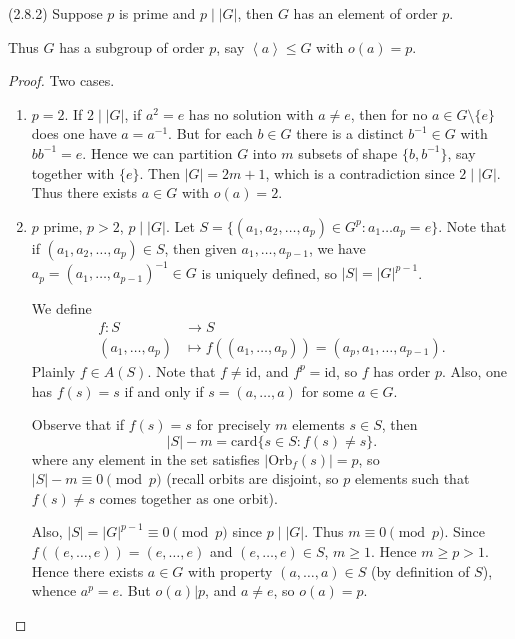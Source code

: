 \begin{theorem}
	(2.8.2)
	Suppose $p$ is prime and $p \mid |G|$, then $G$ has an element of order $p$.

	Thus $G$ has a subgroup of order $p$, say $\left\langle a \right\rangle \le G$ with $o(a) = p$.
\end{theorem}
\begin{proof}
	Two cases.
	\begin{enumerate}
		\item $p = 2$. If $2 \mid |G|$, if $a^2 = e$ has no solution with $a \neq e$, then for no $a \in G \setminus \{e\} $ does one have $a = a^{-1} $. But for each $b \in G$ there is a distinct $b^{-1} \in G$ with $b b^{-1}  = e$. Hence we can partition $G$ into $m$ subsets of shape $\{b, b^{-1} \} $, say together with $\{e\} $. Then $|G| = 2 m + 1$, which is a contradiction since $2 \mid |G|$. Thus there exists  $a \in G$ with $o(a) = 2$.
		\item $p$ prime, $p > 2$, $p \mid |G|$. 
		Let $S = \{\left( a_1, a_2, \ldots, a_p \right) \in G^p: a_1\ldots a_p = e\} $.
		Note that if $(a_1, a_2, \ldots, a_p) \in S$, then given $a_1, \ldots, a_{p-1}$, we have $a_p = (a_1, \ldots, a_{p-1})^{-1}\in G$ is uniquely defined, so $|S| = |G|^{p-1}$.

		We define  
		\begin{align*}
			f: S &\longrightarrow S \\
			\left( a_1, \ldots, a_p \right)  &\longmapsto f(\left( a_1, \ldots, a_p \right) ) = \left( a_p, a_1, \ldots, a_{p-1} \right) 
		.\end{align*}
		Plainly $f \in A(S)$. Note that $f \neq  \text{id}$, and $f^p = \text{id}$, so $f$ has order $p$. Also, one has $f(s) = s$ if and only if  $s=\left( a, \ldots, a \right) $ for some $a \in G$.

		Observe that if $f(s) = s$ for precisely $m$ elements $s \in S$, then \[
			|S| - m
			= \text{card}\{s \in S: f(s)\neq s\} 
		.\] 
		where any element in the set satisfies $|\text{Orb}_f(s) |=p$, so $|S| - m \equiv 0 \pmod p$ (recall orbits are disjoint, so $p$ elements such that $f(s) \neq s$ comes together as one orbit).

		Also, $|S| = |G|^{p-1} \equiv 0 \pmod p$ since $p \mid |G|$. Thus  $m \equiv 0 \pmod p$.
		Since $f\left( (e, \ldots, e) \right) = (e, \ldots, e)$ and $(e ,\ldots,e) \in S$, $m\ge 1$. Hence $m \ge p >1$. Hence there exists $a \in G$ with property $(a, \ldots, a) \in S$ (by definition of $S$), whence  $a^p = e$. But $o(a) | p$, and $a \neq  e$, so $o(a) = p$.
	\end{enumerate}
\end{proof}


